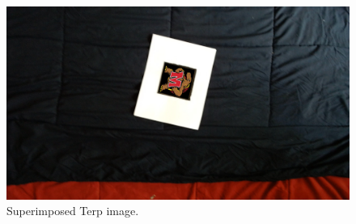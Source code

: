 \documentclass[11pt]{article}
\begin{document}
\begin{figure}[!htbp]
  \centering
	\includegraphics[width=1\textwidth]{terpSuperimposed}
	\caption{Superimposed Terp image.}
\end{figure}
\end{document}
